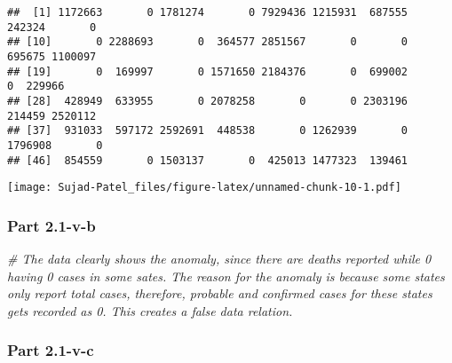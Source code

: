 \documentclass[
]{article}
\newenvironment{Shaded}{\begin{snugshade}}{\end{snugshade}}
\newcommand{\AttributeTok}[1]{\textcolor[rgb]{0.77,0.63,0.00}{#1}}
\newcommand{\CommentTok}[1]{\textcolor[rgb]{0.56,0.35,0.01}{\textit{#1}}}
\newcommand{\DecValTok}[1]{\textcolor[rgb]{0.00,0.00,0.81}{#1}}
\newcommand{\FloatTok}[1]{\textcolor[rgb]{0.00,0.00,0.81}{#1}}
\newcommand{\FunctionTok}[1]{\textcolor[rgb]{0.00,0.00,0.00}{#1}}
\newcommand{\NormalTok}[1]{#1}
\newcommand{\SpecialCharTok}[1]{\textcolor[rgb]{0.00,0.00,0.00}{#1}}
\newcommand{\StringTok}[1]{\textcolor[rgb]{0.31,0.60,0.02}{#1}}
\begin{document}
\begin{verbatim}
##  [1] 1172663       0 1781274       0 7929436 1215931  687555  242324       0
## [10]       0 2288693       0  364577 2851567       0       0  695675 1100097
## [19]       0  169997       0 1571650 2184376       0  699002       0  229966
## [28]  428949  633955       0 2078258       0       0 2303196  214459 2520112
## [37]  931033  597172 2592691  448538       0 1262939       0 1796908       0
## [46]  854559       0 1503137       0  425013 1477323  139461
\end{verbatim}

\begin{Shaded}
\end{Shaded}

\texttt{[image: Sujad-Patel\_files/figure-latex/unnamed-chunk-10-1.pdf]}

\hypertarget{part-2.1-v-b}{%
\subsubsection{Part 2.1-v-b}\label{part-2.1-v-b}}

\begin{Shaded}
\begin{Highlighting}[]
\CommentTok{\# The data clearly shows the anomaly, since there are deaths reported while 0 having 0 cases in some sates. The reason for the anomaly is because some states only report total cases, therefore, probable and confirmed cases for these states gets recorded as 0. This creates a false data relation. }
\end{Highlighting}
\end{Shaded}

\hypertarget{part-2.1-v-c}{%
\subsubsection{Part 2.1-v-c}\label{part-2.1-v-c}}
\end{document}
